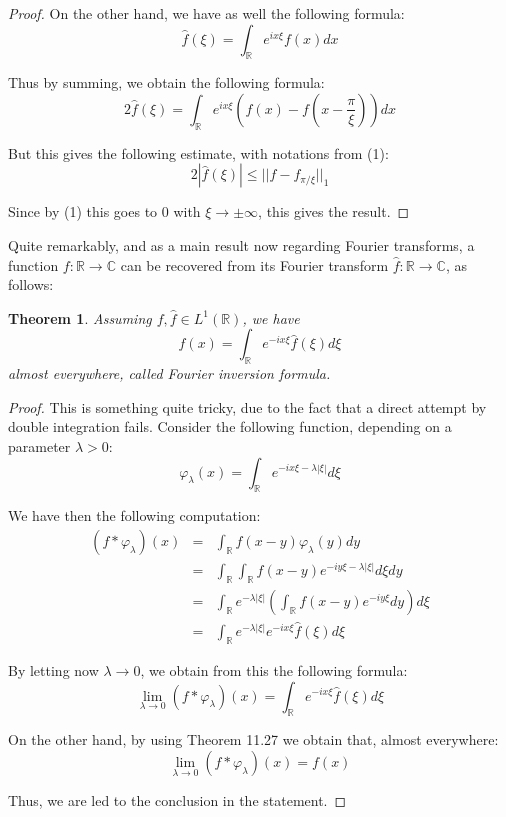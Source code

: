 \documentclass[12pt]{amsbook}
\newtheorem{theorem}{Theorem}[chapter]
\begin{document}
\begin{proof}
On the other hand, we have as well the following formula:
$$\widehat{f}(\xi)=\int_\mathbb Re^{ix\xi}f(x)dx$$

Thus by summing, we obtain the following formula:
$$2\widehat{f}(\xi)=\int_\mathbb Re^{ix\xi}\left(f(x)-f\left(x-\frac{\pi}{\xi}\right)\right)dx$$

But this gives the following estimate, with notations from (1):
$$2|\widehat{f}(\xi)|\leq||f-f_{\pi/\xi}||_1$$

Since by (1) this goes to $0$ with $\xi\to\pm\infty$, this gives the result.
\end{proof}

Quite remarkably, and as a main result now regarding Fourier transforms, a function $f:\mathbb R\to\mathbb C$ can be recovered from its Fourier transform $\widehat{f}:\mathbb R\to\mathbb C$, as follows:


\begin{theorem}
Assuming $f,\widehat{f}\in L^1(\mathbb R)$, we have
$$f(x)=\int_\mathbb R e^{-ix\xi}\widehat{f}(\xi)d\xi$$
almost everywhere, called Fourier inversion formula.
\end{theorem}

\begin{proof}
This is something quite tricky, due to the fact that a direct attempt by double integration fails. Consider the following function, depending on a parameter $\lambda>0$:
$$\varphi_\lambda(x)=\int_\mathbb Re^{-ix\xi-\lambda|\xi|}d\xi$$

We have then the following computation:
\begin{eqnarray*}
(f*\varphi_\lambda)(x)
&=&\int_\mathbb Rf(x-y)\varphi_\lambda(y)dy\\
&=&\int_\mathbb R\int_\mathbb Rf(x-y)e^{-iy\xi-\lambda|\xi|}d\xi dy\\
&=&\int_\mathbb Re^{-\lambda|\xi|}\left(\int_\mathbb Rf(x-y)e^{-iy\xi}dy\right)d\xi\\
&=&\int_\mathbb Re^{-\lambda|\xi|}e^{-ix\xi}\widehat{f}(\xi)d\xi
\end{eqnarray*}

By letting now $\lambda\to0$, we obtain from this the following formula:
$$\lim_{\lambda\to0}(f*\varphi_\lambda)(x)=\int_\mathbb R e^{-ix\xi}\widehat{f}(\xi)d\xi$$

On the other hand, by using Theorem 11.27 we obtain that, almost everywhere:
$$\lim_{\lambda\to0}(f*\varphi_\lambda)(x)=f(x)$$

Thus, we are led to the conclusion in the statement.
\end{proof}
\end{document}
